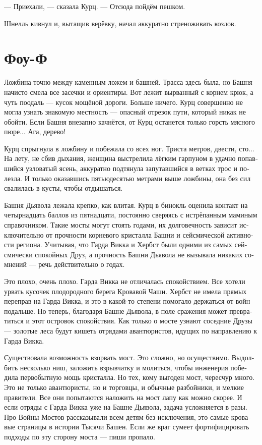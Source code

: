 \documentclass[a4paper,12pt,fleqn]{book}\usepackage{polyglossia}\setdefaultlanguage[babelshorthands=true]{russian}\setotherlanguage{english}\defaultfontfeatures{Ligatures=TeX,Mapping=tex-text}\usepackage{xcolor}\newcommand{\ml}[3]{#2}
\begin{document}
--- Приехали, --- сказала Курц.
--- Отсюда пойдём пешком.

Шнелль кивнул и, вытащив верёвку, начал аккуратно стреноживать козлов.

\section{Фоу-Ф}

Ложбина точно между каменным ложем и башней.
Трасса здесь была, но Башня начисто смела все засечки и ориентиры.
Вот лежит вырванный с корнем крюк, а чуть поодаль --- кусок мощёной дороги.
Больше ничего.
Курц совершенно не могла узнать знакомую местность --- опасный отрезок пути, который никак не обойти.
Если Башня внезапно качнётся, от Курц останется только горсть мясного пюре...
Ага, дерево!

Курц спрыгнула в ложбину и побежала со всех ног.
Триста метров, двести, сто...
На лету, не сбив дыхания, женщина выстрелила лёгким гарпуном в удачно попавшийся узловатый ясень, аккуратно подтянула запутавшийся в ветках трос и полезла.
И только оказавшись пятьюдесятью метрами выше ложбины, она без сил свалилась в кусты, чтобы отдышаться.

Башня Дьявола лежала крепко, как влитая.
Курц в бинокль оценила контакт на четырнадцать баллов из пятнадцати, постоянно сверяясь с истрёпанным маминым справочником.
Такие мосты могут стоять годами, их долговечность зависит исключительно от прочности корневого кристалла Башни и сейсмической активности региона.
Учитывая, что Гарда Викка и Хербст были одними из самых сейсмически спокойных Друз, а прочность Башни Дьявола не вызывала никаких сомнений --- речь действительно о годах.

Это плохо, очень плохо.
Гарда Викка не отличалась спокойствием.
Все хотели урвать кусочек плодородного берега Кровавой Чаши.
Хербст не имела прямых переправ на Гарда Викка, и это в какой-то степени помогало держаться от войн подальше.
Но теперь, благодаря Башне Дьявола, в поле сражения может превратиться и этот островок спокойствия.
Как только о мосте узнают соседние Друзы --- золотые леса будут кишеть отрядами авантюристов, идущих по направлению к Гарда Викка.

Существовала возможность взорвать мост.
Это сложно, но осуществимо.
Выдолбить несколько ниш, заложить взрывчатку и молиться, чтобы инженерия победила первобытную мощь кристалла.
Но тех, кому выгоден мост, чересчур много.
Это не только авантюристы, но и торговцы, и обычные разбойники, и мелкие правители.
Все они попытаются наложить на мост лапу как можно скорее.
И если отряды с Гарда Викка уже на Башне Дьявола, задача усложняется в разы.
Про Войны Мостов рассказывали всем детям без исключения, это самые кровавые страницы в истории Тысячи Башен.
Если же враг сумеет фортифицировать подходы по эту сторону моста --- пиши пропало.
\end{document}
